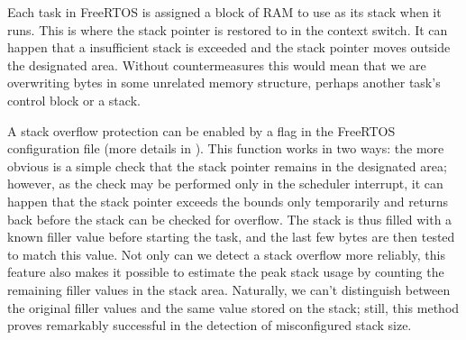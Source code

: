 Each task in FreeRTOS is assigned a block of \gls{RAM} to use as its stack when it runs. This is where the stack pointer is restored to in the context switch. It can happen that a insufficient stack is exceeded and the stack pointer moves outside the designated area. Without countermeasures this would mean that we are overwriting bytes in some unrelated memory structure, perhaps another task's control block or a stack.

A stack overflow protection can be enabled by a flag in the FreeRTOS configuration file (more details in \cite{freertos-stackov}). This function works in two ways: the more obvious is a simple check that the stack pointer remains in the designated area; however, as the check may be performed only in the scheduler interrupt, it can happen that the stack pointer exceeds the bounds only temporarily and returns back before the stack can be checked for overflow. The stack is thus filled with a known filler value before starting the task, and the last few bytes are then tested to match this value. Not only can we detect a stack overflow more reliably, this feature also makes it possible to estimate the peak stack usage by counting the remaining filler values in the stack area. Naturally, we can't distinguish between the original filler values and the same value stored on the stack; still, this method proves remarkably successful in the detection of misconfigured stack size.


